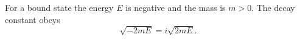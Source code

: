 \documentclass{article}
\begin{document}
For a bound state the energy $E$ is negative and the mass is $m>0$. The decay constant obeys
\begin{equation}
\sqrt{-2mE} = i\sqrt{2mE} .
\label{eq:kappa}
\end{equation}
\end{document}
